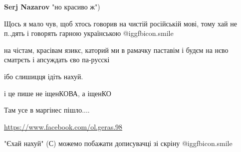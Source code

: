 \begin{itemize}
{\begin{itemize}
{\textbf{Serj Nazarov} "но красиво ж")
}\end{itemize}

 
Щось я мало чув, щоб хтось говорив на чистій російській мові, тому хай не п..дять і говорять гарною українською  @igg{fbicon.smile} 

 
на чістам, красівам язикє, каторий ми в рамачку паставім і будєм на нєво сматрєть і апсуждать єво па-русскі

 
ібо слишицця ідіть нахуй.

 
і це пише не іщенКОВА, а іщенКО

 
Там усе в маргінес пішло....

\url{https://www.facebook.com/ol.geras.98}\par
 
"Єхай нахуй" (С) можемо побажати дописувачці зі скріну  @igg{fbicon.smile} 

}
\end{itemize}
